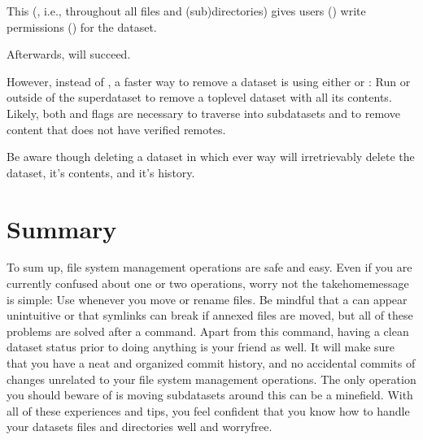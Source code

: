 \sphinxAtStartPar
This  (, i.e., throughout all files and (sub)directories) gives users
() write permissions () for the dataset.

\sphinxAtStartPar
Afterwards,  will succeed.

\sphinxAtStartPar
However, instead of , a faster way to remove a dataset is using either  or  : Run  or  outside of the
superdataset to remove a top\sphinxhyphen{}level dataset with all its contents. Likely,
both   and  flags are necessary
to traverse into subdatasets and to remove content that does not have verified remotes.

\sphinxAtStartPar
Be aware though deleting a dataset in which ever way will
irretrievably delete the dataset, it’s contents, and it’s history.


\section{Summary}
\label{\detokenize{basics/101-136-filesystem:summary}}
\sphinxAtStartPar
To sum up, file system management operations are safe and easy.
Even if you are currently confused about one or two operations,
worry not \textendash{} the take\sphinxhyphen{}home\sphinxhyphen{}message is simple: Use 
whenever you move or rename files. Be mindful that a 
can appear unintuitive or that symlinks can break if annexed files are moved,
but all of these problems are solved after a  command.
Apart from this command, having a clean dataset status prior to doing anything
is your friend as well. It will make sure that you have a neat and organized
commit history, and no accidental commits of changes unrelated to your file
system management operations. The only operation you should beware of is
moving subdatasets around \textendash{} this can be a minefield.
With all of these experiences and tips, you feel confident that you know
how to handle your datasets files and directories well and worry\sphinxhyphen{}free.

\sphinxstepscope


